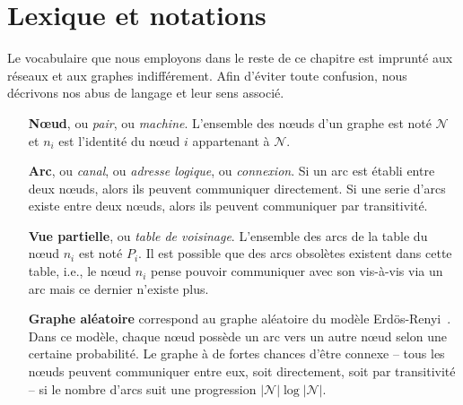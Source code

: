
\section{Lexique et notations}
\label{net:sec:lexique}

Le vocabulaire que nous employons dans le reste de ce chapitre est imprunté aux
réseaux et aux graphes indifférement. Afin d'éviter toute confusion, nous
décrivons nos abus de langage et leur sens associé.

\begin{itemize}
\item [\textbf{Nœud},] ou \emph{pair}, ou \emph{machine}. L'ensemble des nœuds
  d'un graphe est noté $\mathcal{N}$ et $n_i$ est l'identité du nœud $i$
  appartenant à $\mathcal{N}$.
\item [\textbf{Arc},] ou \emph{canal}, ou \emph{adresse logique}, ou
  \emph{connexion}. Si un arc est établi entre deux nœuds, alors ils peuvent
  communiquer directement. Si une serie d'arcs existe entre deux nœuds, alors
  ils peuvent communiquer par transitivité.
\item [\textbf{Vue partielle},] ou \emph{table de voisinage}. L'ensemble des
  arcs de la table du nœud $n_i$ est noté $P_i$. Il est possible que des arcs
  obsolètes existent dans cette table, i.e., le nœud $n_i$ pense pouvoir
  communiquer avec son vis-à-vis via un arc mais ce dernier n'existe plus.
\item [\textbf{Graphe aléatoire}] correspond au graphe aléatoire du modèle
  Erdös-Renyi~\cite{erdos1959random}. Dans ce modèle, chaque nœud possède un
  arc vers un autre nœud selon une certaine probabilité. Le graphe à de fortes
  chances d'être connexe -- tous les nœuds peuvent communiquer entre eux, soit
  directement, soit par transitivité -- si le nombre d'arcs suit une progression
  $|\mathcal{N}|\log |\mathcal{N}|$.
\item [\textbf{\TODO{Autre}}]
\end{itemize}

